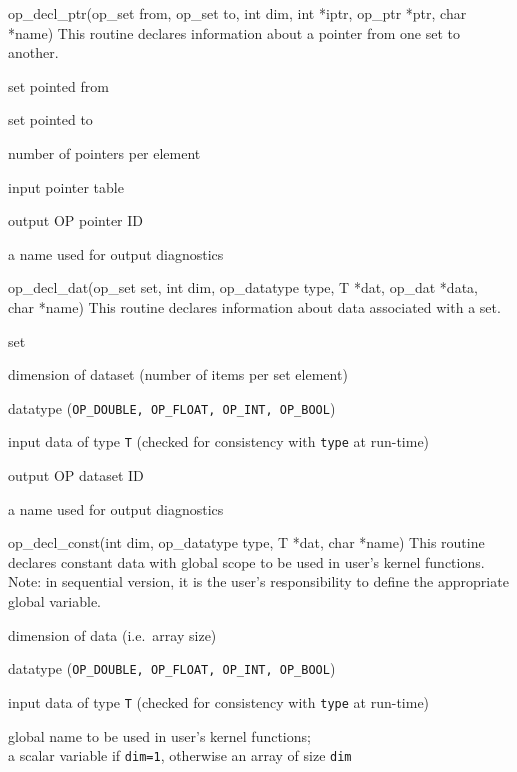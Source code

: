 \begin{routine} {op\_decl\_ptr(op\_set from, op\_set to, int dim, int *iptr, op\_ptr *ptr, char *name)}
{This routine declares information about a pointer from one set to another.}

\item[from]          set pointed from
\item[to]            set pointed to
\item[dim]           number of pointers per element
\item[iptr]          input pointer table
\item[ptr]           output OP pointer ID
\item[name]          a name used for output diagnostics
\end{routine}

\newpage

\begin{routine} {op\_decl\_dat(op\_set set, int dim, op\_datatype type, T *dat, op\_dat *data,\\ char *name)}
{This routine declares information about data associated with a set.}

\item[set]           set
\item[dim]           dimension of dataset (number of items per set element)
\item[type]          datatype ({\tt OP\_DOUBLE, OP\_FLOAT, OP\_INT, OP\_BOOL})
\item[idat]          input data of type {\tt T}  (checked for consistency with {\tt type} at run-time)
\item[dat]           output OP dataset ID
\item[name]          a name used for output diagnostics
\end{routine}

\begin{routine} {op\_decl\_const(int dim, op\_datatype type, T *dat, char *name)}
{This routine declares constant data with global scope to be used in user's kernel functions.
Note: in sequential version, it is the user's responsibility to define the appropriate global
variable.}

\item[dim]           dimension of data (i.e.~array size)
\item[type]          datatype ({\tt OP\_DOUBLE, OP\_FLOAT, OP\_INT, OP\_BOOL})
\item[idat]          input data of type {\tt T}  (checked for consistency with {\tt type} at run-time)
\item[name]          global name to be used in user's kernel functions;\\
                     a scalar variable if {\tt dim=1}, otherwise an array of size {\tt dim}
\end{routine}


